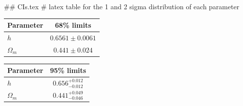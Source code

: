 ## CIs.tex
# latex table for the 1 and 2 sigma distribution of each parameter

\begin{tabular} { l  c}
 Parameter &  68\% limits\\
\hline
{\boldmath$h              $} & $0.6561\pm 0.0061          $\\
{\boldmath$\Omega_m       $} & $0.441\pm 0.024            $\\
\hline
\end{tabular}

\begin{tabular} { l  c}
 Parameter &  95\% limits\\
\hline
{\boldmath$h              $} & $0.656^{+0.012}_{-0.012}   $\\
{\boldmath$\Omega_m       $} & $0.441^{+0.049}_{-0.046}   $\\
\hline
\end{tabular}
